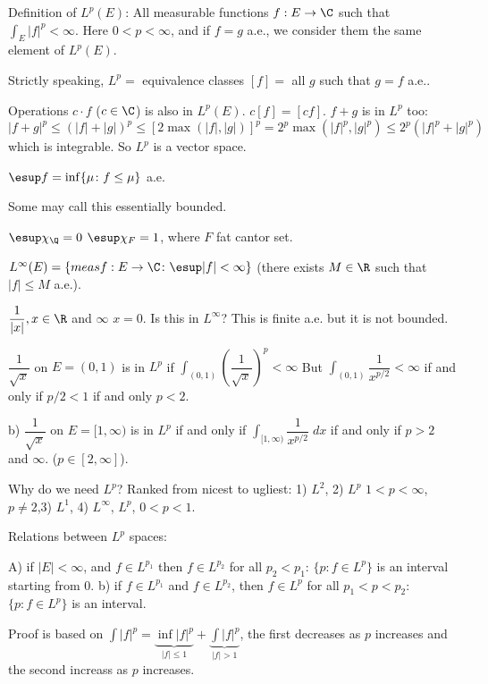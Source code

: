 Definition of $L^p(E)$: All measurable functions $f: E \to \C$ such that $\int_E |f|^p< \infty$. Here $0<p< \infty$, and if $f=g$ a.e., we consider them the same element of $L^p(E)$. 

Strictly speaking, $L^p=$ equivalence classes $[f]=$ all $g$ such that $g=f$ a.e.. 

Operations $c \cdot f$ ($c \in \C$) is also in $L^p(E)$. $c[f]=[cf]$. $f+g$ is in $L^p$ too:
	\[
	|f+g|^p \leq (|f|+|g|)^p \leq [2 \max(|f|,|g|)]^p = 2^p \max(|f|^p,|g|^p) \leq 2^p(|f|^p+|g|^p)
	\]
which is integrable. So $L^p$ is a vector space. 


\begin{dfn}
$\esup f= \inf\{ \mu \colon f \leq \mu\}$ a.e. 
\end{dfn}


Some may call this essentially bounded. 


\begin{ex}
$\esup \chi_\Q=0$
$\esup \chi_F=1$, where $F$ fat cantor set. 
\end{ex}


$L^\infty(E)= \{meas f: E \to \C \colon \esup |f|<\infty\}$ (there exists $M \in \R$ such that $|f| \leq M$ a.e.). 

$\dfrac{1}{|x|}, x \in \R$ and $\infty$ $x=0$. Is this in $L^\infty$? This is finite a.e. but it is not bounded. 

\begin{ex}
$\dfrac{1}{\sqrt{x}}$ on $E=(0,1)$ is in $L^p$ if $\int_{(0,1)} \left(\dfrac{1}{\sqrt{x}}\right)^p<\infty$ But $\int_{(0,1)} \dfrac{1}{x^{p/2}}< \infty$ if and only if $p/2<1$ if and only $p<2$.

b) $\dfrac{1}{\sqrt{x}}$ on $E=[1,\infty)$ is in $L^p$ if and only if $\int_{[1,\infty)} \dfrac{1}{x^{p/2}} \; dx$ if and only if $p>2$ and $\infty$. ($p \in [2,\infty]$). 
\end{ex}


Why do we need $L^p$? Ranked from nicest to ugliest: 1) $L^2$, 2) $L^p$ $1<p<\infty$, $p \neq 2$,3) $L^1$, 4) $L^\infty$, $L^p$, $0<p<1$. 


Relations between $L^p$ spaces:

A) if $|E|<\infty$, and $f \in L^{p_1}$ then $f \in L^{p_2}$ for all $p_2<p_1$: $\{p \colon f \in L^p\}$ is an interval starting from 0.
b) if $f \in L^{p_1}$ and $f \in L^{p_2}$, then $f \in L^p$ for all $p_1<p<p_2$: $\{p \colon f\in L^p\}$ is an interval.


Proof is based on $\int |f|^p= \underbrace{\inf |f|^p}_{|f| \leq 1} + \underbrace{\int |f|^p}_{|f|>1}$, the first decreases as $p$ increases and the second increass as $p$ increases.

